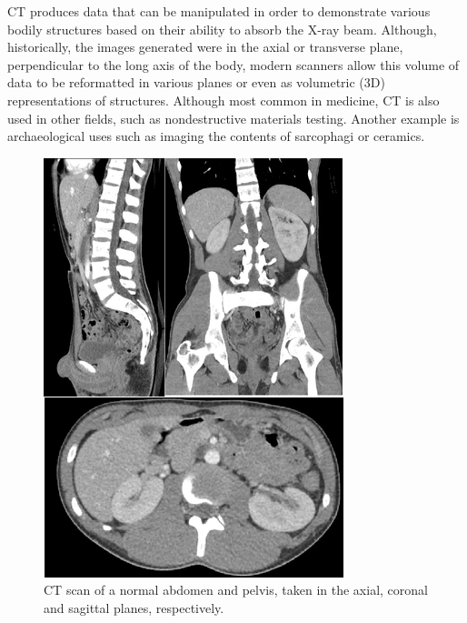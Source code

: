 \documentclass[12pt]{article}
\begin{document}
CT produces data that can be manipulated in order to demonstrate various bodily structures based on their ability to absorb the X-ray beam. Although, historically, the images generated were in the axial or transverse plane, perpendicular to the long axis of the body, modern scanners allow this volume of data to be reformatted in various planes or even as volumetric (3D) representations of structures. Although most common in medicine, CT is also used in other fields, such as nondestructive materials testing. Another example is archaeological uses such as imaging the contents of sarcophagi or ceramics.
\begin{figure}[h!]
  \centering
  \includegraphics[width=0.45\linewidth]{CT1.png}
  \caption{\small{CT scan of a normal abdomen and pelvis, taken in the axial, coronal and sagittal planes, respectively.}}
  \label{fig:CT scan of a normal abdomen and pelvis, taken in the axial, coronal and sagittal planes, respectively.}
\end{figure}
\end{document}

